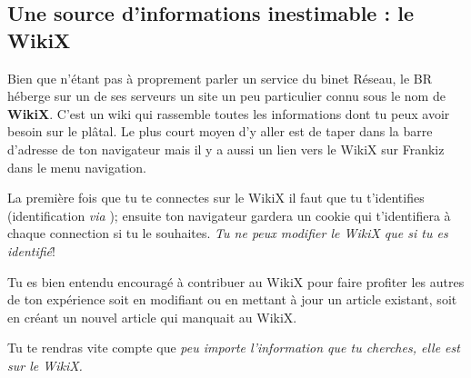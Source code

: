 
\subsection{Une source d'informations inestimable : le WikiX}
\label{WikiX}
Bien que n'\'etant pas \`a proprement parler un service du binet R\'eseau, le BR h\'eberge sur un de ses serveurs un site un peu particulier connu sous le nom de \textbf{WikiX}. C'est un wiki qui rassemble toutes les informations dont tu peux avoir besoin sur le pl\^atal. Le plus court moyen d'y aller est de taper  dans la barre d'adresse de ton navigateur mais il y a aussi un lien vers le WikiX sur Frankiz dans le menu navigation.

La premi\`ere fois que tu te connectes sur le WikiX il faut que tu t'identifies (identification \emph{via} ); ensuite ton navigateur gardera un cookie qui t'identifiera \`a chaque connection si tu le souhaites. \emph{Tu ne peux modifier le WikiX que si tu es identifi\'e}!

Tu es bien entendu encourag\'e \`a contribuer au WikiX pour faire profiter les autres de ton exp\'erience soit en modifiant ou en mettant \`a jour un article existant, soit en cr\'eant un nouvel article qui manquait au WikiX.


Tu te rendras vite compte que \emph{peu importe l'information que tu cherches, elle est sur le WikiX.}
